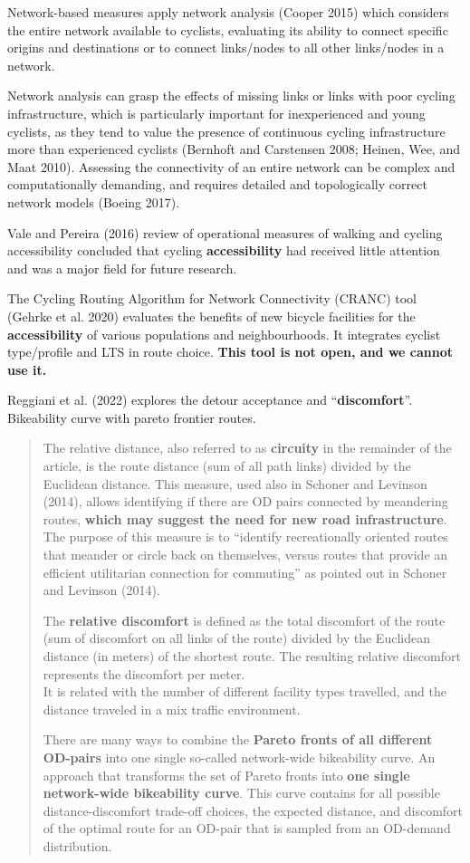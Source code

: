 \documentclass[
  sn-nature,
]{sn-jnl}
\begin{document}
Network-based measures apply network analysis (Cooper 2015) which
considers the entire network available to cyclists, evaluating its
ability to connect specific origins and destinations or to connect
links/nodes to all other links/nodes in a network.

Network analysis can grasp the effects of missing links or links with
poor cycling infrastructure, which is particularly important for
inexperienced and young cyclists, as they tend to value the presence of
continuous cycling infrastructure more than experienced cyclists
(Bernhoft and Carstensen 2008; Heinen, Wee, and Maat 2010). Assessing
the connectivity of an entire network can be complex and computationally
demanding, and requires detailed and topologically correct network
models (Boeing 2017).

Vale and Pereira (2016) review of operational measures of walking and
cycling accessibility concluded that cycling \textbf{accessibility} had
received little attention and was a major field for future research.

The Cycling Routing Algorithm for Network Connectivity (CRANC) tool
(Gehrke et al. 2020) evaluates the benefits of new bicycle facilities
for the \textbf{accessibility} of various populations and
neighbourhoods. It integrates cyclist type/profile and LTS in route
choice. \textbf{This tool is not open, and we cannot use it.}

Reggiani et al. (2022) explores the detour acceptance and
``\textbf{discomfort}''. Bikeability curve with pareto frontier routes.

\begin{quote}
The relative distance, also referred to as \textbf{circuity} in the
remainder of the article, is the route distance (sum of all path links)
divided by the Euclidean distance. This measure, used also in Schoner
and Levinson (2014), allows identifying if there are OD pairs connected
by meandering routes, \textbf{which may suggest the need for new road
infrastructure}. The purpose of this measure is to ``identify
recreationally oriented routes that meander or circle back on
themselves, versus routes that provide an efficient utilitarian
connection for commuting'' as pointed out in Schoner and Levinson
(2014).

The \textbf{relative discomfort} is defined as the total discomfort of
the route (sum of discomfort on all links of the route) divided by the
Euclidean distance (in meters) of the shortest route. The resulting
relative discomfort represents the discomfort per meter.\\
It is related with the number of different facility types travelled, and
the distance traveled in a mix traffic environment.

There are many ways to combine the \textbf{Pareto fronts of all
different OD-pairs} into one single so-called network-wide bikeability
curve. An approach that transforms the set of Pareto fronts into
\textbf{one single network-wide bikeability curve}. This curve contains
for all possible distance-discomfort trade-off choices, the expected
distance, and discomfort of the optimal route for an OD-pair that is
sampled from an OD-demand distribution.
\end{quote}
\end{document}
